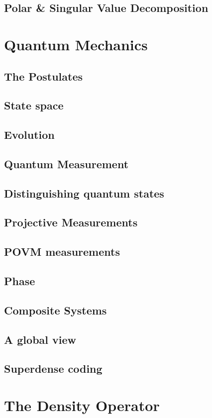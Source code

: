 \documentclass{book}
\theoremstyle{definition}
\begin{document}
\subsection{Polar \& Singular Value Decomposition}
\newpage
\section{Quantum Mechanics}
\subsection{The Postulates}
\subsection{State space}
\subsection{Evolution}
\subsection{Quantum Measurement}
\subsection{Distinguishing quantum states}
\subsection{Projective Measurements}
\subsection{POVM measurements}
\subsection{Phase}
\subsection{Composite Systems}
\subsection{A global view}
\subsection{Superdense coding}
\newpage
\section{The Density Operator}
\end{document}
